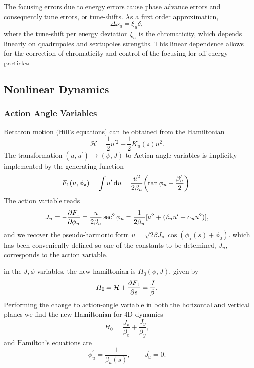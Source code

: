The focusing errors due to energy errors cause phase advance errors and consequently tune errors, or tune-shifts. As a first order approximation,
\begin{equation}
    \Delta \nu_u = \xi_u \delta,
\end{equation}
where the tune-shift per energy deviation $\xi_u$ is the chromaticity, which depends linearly on quadrupoles and sextupoles strengths. This linear dependence allows for the correction of chromaticity and control of the focusing for off-energy particles.
\subsection{Nonlinear Dynamics}
\subsubsection{Action Angle Variables}
Betatron motion (Hill's equations) can be obtained from the Hamiltonian
\begin{equation}
    \mathcal{H}=\frac{1}{2}u^{\prime2}+\frac{1}{2}K_u(s)u^2.
\end{equation}
The transformation $(u,u^\prime)\to(\psi, J)$ to Action-angle variables is implicitly implemented by the generating function
\begin{equation}
    F_1(u,\phi_u)=\int{u}^\prime\dd{{u}}=\frac{u^2}{2\beta_u}\qty(\tan \phi_u-\frac{\beta_u^\prime}{2}).
\end{equation}
The action variable reads
\begin{equation}
    J_u=-\pdv{F_1}{\phi_u} = \frac{u}{2\beta_u}\sec^2\phi_u = \frac{1}{2\beta_u}[u^2 + (\beta_u u^\prime + \alpha_u u^2)],
    \label{eq:action}
\end{equation}
and we recover the pseudo-harmonic form $u=\sqrt{2\beta J_u}\cos(\phi_u(s)+\phi_0)$, which has been conveniently defined so one of the constants to be detemined, $J_u$, corresponds to the action variable.

in the $J,\phi$ variables, the new hamiltonian is $H_0(\phi, J)$,  given by
\begin{equation}
    H_0=\mathcal{H}+\pdv{F_1}{s} = \frac{J}{\beta}.
\end{equation}
Performing the change to action-angle variable in both the horizontal and vertical planes we find the new Hamiltonian for 4D dynamics
\begin{equation}
    H_0= \frac{J_x}{\beta_x} +  \frac{J_y}{\beta_y},
\end{equation}
and Hamilton's equations are
\begin{equation}
    \phi_u^\prime = \frac{1}{\beta_u(s)},\qquad J_u^\prime=0.
\end{equation}
